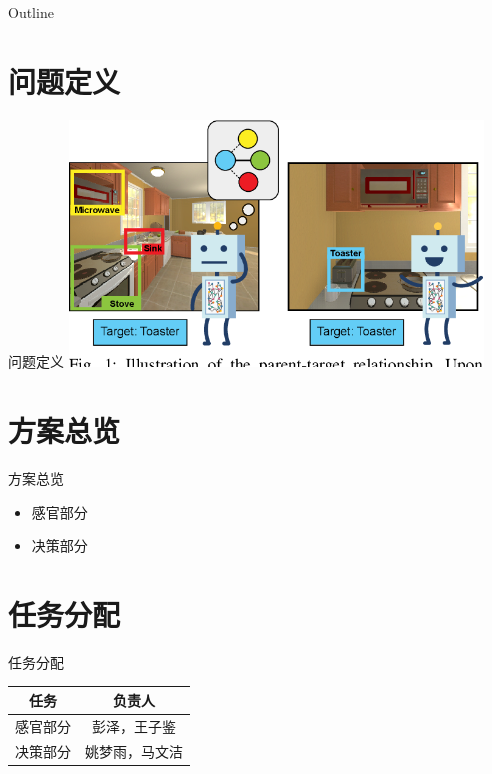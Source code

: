 \begin{frame}{Outline}
    \tableofcontents
\end{frame}

\section{问题定义}
\begin{frame}{问题定义}
    \centering
    \includegraphics[width=11cm,trim=0 20 0 0,clip]{assets/problem.png}
\end{frame}



\section{方案总览}
\begin{frame}{方案总览}
    \begin{itemize}
        \item 感官部分
        \item 决策部分
    \end{itemize}
\end{frame}

\section{任务分配}
\begin{frame}{任务分配}
    \begin{table}[h]
        \centering
        \begin{tabular}{cc}
            \toprule
            任务 & 负责人\\
            \midrule
            感官部分 & 彭泽，王子鉴\\
            决策部分 & 姚梦雨，马文洁\\
            \bottomrule
        \end{tabular}
    \end{table}
\end{frame}